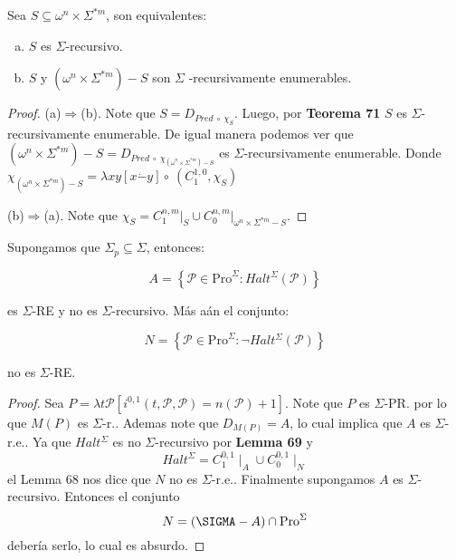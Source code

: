   \begin{theorem}
    \PN Sea $S \subseteq \omega^{n} \times \Sigma^{\ast m}$, son equivalentes:

    \begin{enumerate}[a)]
      \item $S$ es $\Sigma$-recursivo.
      \item $S$ y $(\omega^{n} \times \Sigma^{\ast m}) - S$ son $\Sigma$ -recursivamente enumerables.
    \end{enumerate}
  \end{theorem}
  \begin{proof}
    (a)$\Rightarrow $(b)$.$ Note que $S=D_{Pred\ \circ\ \chi _{S}}.$
    Luego, por \textbf{Teorema 71} $S$ es $\Sigma $-recursivamente enumerable. De igual manera podemos ver que
    $(\omega^{n} \times \Sigma^{\ast m})-S=D_{Pred\ \circ\ \chi _{(\omega^{n} \times \Sigma^{\ast m})-S}}$
    es $\Sigma $-recursivamente enumerable.
    Donde $\chi_{(\omega^{n} \times \Sigma^{\ast m})-S} = \lambda xy \left[x \dot{-}y\right] \circ\ (C_{1}^{1,0},
    \chi_S)$

    (b)$\Rightarrow $(a). Note que $\chi _{S}=C_{1}^{n,m}\mathrm{\mid }_{S}\cup C_{0}^{n,m}\mathrm{\mid }_{\omega
    ^{n}\times \Sigma^{\ast m}-S}$.
  \end{proof}

  \begin{lemma}
    \PN Supongamos que $\Sigma_{p} \subseteq \Sigma$, entonces:

    \[
      A = \left\{\mathcal{P} \in \mathrm{Pro}^{\Sigma}: Halt^{\Sigma}(\mathcal{P})\right\}
    \]

    \PN es $\Sigma$-RE y no es $\Sigma$-recursivo. Más aán el conjunto:

    \[
      N = \left\{\mathcal{P} \in \mathrm{Pro}^{\Sigma}: \lnot Halt^{\Sigma}(\mathcal{P})\right\}
    \]

    \PN no es $\Sigma$-RE.
  \end{lemma}
  \begin{proof}
    Sea $P=\lambda t\mathcal{P}\left[ i^{0,1}(t,\mathcal{P},\mathcal{P})=n( \mathcal{P})+1\right] $.
    Note que $P$ es $\Sigma $-PR. por lo que $M(P)$ es $\Sigma $-r.. Ademas note que $D_{M(P)}=A$,
    lo cual implica que $A$ es $ \Sigma $-r.e.. Ya que $Halt^{\Sigma}$ es no $\Sigma $-recursivo por \textbf{Lemma 69} y
    \[
      \displaystyle Halt^{\Sigma}=C_{1}^{0,1}\mid _{A}\cup C_{0}^{0,1}\mid _{N}
    \]
    el Lemma 68 nos dice que $N$ no es $\Sigma $-r.e.. Finalmente supongamos $A$ es $\Sigma $-recursivo. Entonces el conjunto
    \[
      \displaystyle N=\left( \SIGMA-A\right) \cap \mathrm{Pro}^{\Sigma}
    \]
    debería serlo, lo cual es absurdo.
  \end{proof}
